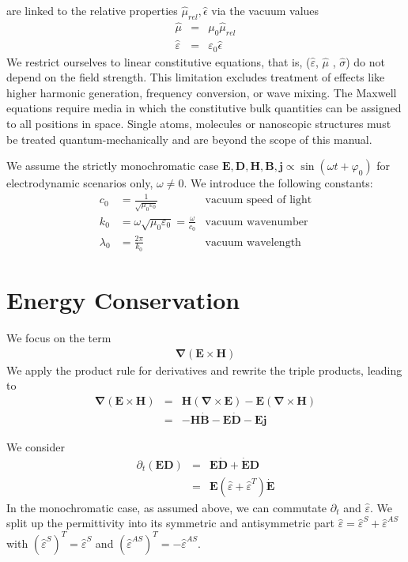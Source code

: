 \documentclass[12pt,a4paper,twoside,openright,BCOR10mm,headsepline,titlepage,abstracton,chapterprefix,final]{scrreprt}
\newcommand\Vector[1]{{\mathbf{#1}}}
\newcommand\vacuum{0}
\newcommand\wavenumber{k}
\newcommand\Nabla{\Vector{\nabla}}
\newcommand\timederivative[1]{\dot{{#1}}}
\newcommand\Tensor[1]{\hat{#1}}
\newcommand\scalarEfield{E}
\newcommand\scalarBfield{B}
\newcommand\scalarHfield{H}
\newcommand\scalarDfield{D}
\newcommand\Efield{\Vector{\scalarEfield}}
\newcommand\Bfield{\Vector{\scalarBfield}}
\newcommand\Hfield{\Vector{\scalarHfield}}
\newcommand\Dfield{\Vector{\scalarDfield}}
\newcommand\permeability{\Tensor{\scalarpermeability}}
\newcommand\vacuumpermeability{\scalarpermeability_{\vacuum}}
\newcommand\scalarpermeability{\mu}
\newcommand\relativepermeability{\Tensor{\mu}_{rel}}
\newcommand\permittivity{\Tensor{\scalarpermittivity}}
\newcommand\vacuumpermittivity{\scalarpermittivity_{\vacuum}}
\newcommand\scalarrelativepermittivity{\epsilon}
\newcommand\relativepermittivity{\Tensor{\scalarrelativepermittivity}}
\newcommand\scalarpermittivity{\varepsilon}
\newcommand\conductivity{\Tensor{\sigma}}
\newcommand\currentdensity{\Vector{j}}
\begin{document}
are linked to the relative properties $\relativepermeability, \relativepermittivity$ via
the vacuum values
\begin{eqnarray}
 \permeability &=& \vacuumpermeability \relativepermeability \\
 \permittivity &=& \vacuumpermittivity \relativepermittivity
\end{eqnarray}
We restrict ourselves to linear constitutive equations, that is, ($\permittivity$, $\permeability$ , $\conductivity$) do not depend on the field strength.
This limitation excludes treatment of effects like higher harmonic generation, frequency conversion, or wave mixing.
The Maxwell equations require media in which the constitutive bulk quantities can be assigned to all positions in space.
Single atoms, molecules or nanoscopic structures must be treated quantum-mechanically and are beyond the scope of this manual.

We assume the strictly monochromatic case $\Efield,\Dfield,\Hfield,\Bfield, \currentdensity \propto \sin(\omega t + \varphi_0)$ for electrodynamic scenarios only, $\omega \neq 0$.
We introduce the following constants:
\begin{align}
 c_\vacuum &= \frac{1}{\sqrt{\vacuumpermeability\vacuumpermittivity}} & \textrm{vacuum speed of light} \\
 \wavenumber_\vacuum &= \omega \sqrt{\vacuumpermeability\vacuumpermittivity} = \frac{\omega}{c_\vacuum}& \textrm{vacuum wavenumber} \\
 \lambda_\vacuum &= \frac{2\pi}{\wavenumber_\vacuum} & \textrm{vacuum wavelength}
\end{align}

\section{Energy Conservation}
We focus on the term
\begin{eqnarray}
   \Nabla ( \Efield \times \Hfield )
\end{eqnarray}
We apply the product rule for derivatives and rewrite the triple products, leading to
\begin{eqnarray}
   \Nabla ( \Efield \times \Hfield ) &=& \Hfield ( \Nabla \times \Efield ) - \Efield ( \Nabla \times \Hfield ) \\
   &=& - \Hfield \timederivative{\Bfield} - \Efield  \timederivative{\Dfield} - \Efield \currentdensity
\end{eqnarray}

We consider
\begin{eqnarray}
 \partial_t (\Efield \Dfield) &=& \Efield  \timederivative{\Dfield} +  \timederivative{\Efield} \Dfield \\
                              &=& \Efield ( \permittivity + \permittivity^T ) \timederivative{\Efield} 
\end{eqnarray}
In the monochromatic case, as assumed above, we can commutate $\partial_t$ and $\permittivity$.
We split up the permittivity into its symmetric and antisymmetric part $\permittivity =  \permittivity^S +  \permittivity^{AS}$ with
$(\permittivity^S)^T = \permittivity^S$ and $(\permittivity^{AS})^T = - \permittivity^{AS}$. 
\end{document}
